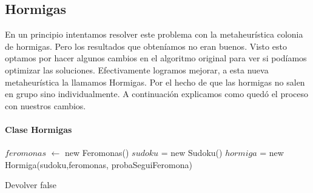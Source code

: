 \subsection{Hormigas}

En un principio intentamos resolver este problema con la metaheurística colonia de hormigas. Pero los resultados que obteníamos no eran buenos. Visto esto optamos por hacer algunos cambios en el algoritmo original para ver si podíamos optimizar las soluciones. Efectivamente logramos mejorar, a esta nueva metaheurística la llamamos Hormigas. Por el hecho de que las hormigas no salen en grupo sino individualmente. A continuación explicamos como qued\'o el proceso con nuestros cambios.
\paragraph{Clase Hormigas}
\begin{algorithmic}[1]

\State $feromonas$ $\gets$ new Feromonas()
	\State $sudoku$ = new Sudoku()
	\State $hormiga$ = new Hormiga(sudoku,feromonas, probaSeguiFeromona)
	\EndIf
	\EndIf
	
\EndFor

\State Devolver false
\EndFunction
\end{algorithmic}
